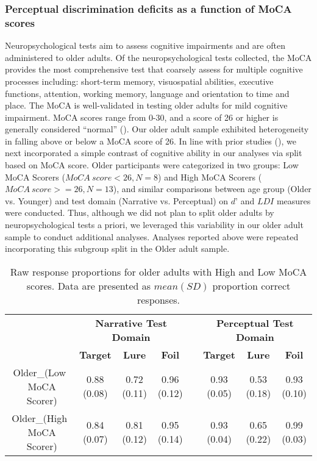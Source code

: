 \documentclass[11pt]{article}
\begin{document}
\subsubsection*{Perceptual discrimination deficits as a function of MoCA scores}
Neuropsychological tests aim to assess cognitive impairments and are often administered to older adults. Of the neuropsychological tests collected, the MoCA provides the most comprehensive test that coarsely assess for multiple cognitive processes including: short-term memory, visuospatial abilities, executive functions, attention, working memory, language and orientation to time and place. The MoCA is well-validated in testing older adults for mild cognitive impairment. MoCA scores range from 0-30, and a score of 26 or higher is generally considered “normal” (\cite{nasreddine_montreal_2005}). Our older adult sample exhibited heterogeneity in falling above or below a MoCA score of 26. In line with prior studies (\cite{pishdadian_not_2020}), we next incorporated a simple contrast of cognitive ability in our analyses via split based on MoCA score. Older participants were categorized in two groups: Low MoCA Scorers ($MoCA \ score < 26, N = 8$) and High MoCA Scorers ($MoCA \ score >= 26, N =13$), and similar comparisons between age group (Older vs. Younger) and test domain (Narrative vs. Perceptual) on $d’$ and $LDI$ measures were conducted. Thus, although we did not plan to split older adults by neuropsychological tests a priori, we leveraged this variability in our older adult sample to conduct additional analyses. Analyses reported above were repeated incorporating this subgroup split in the Older adult sample.

\begin{table}[]
\begin{tabular}{cccccccc}
                                & \multicolumn{3}{c}{\textbf{Narrative Test Domain}} & \textbf{} & \multicolumn{3}{c}{\textbf{Perceptual Test Domain}} \\ \cline{2-4} \cline{6-8} 
 & \textbf{Target} & \textbf{Lure} & \textbf{Foil} & \textbf{} & \textbf{Target} & \textbf{Lure} & \textbf{Foil} \\ \cline{2-4} \cline{6-8} 
Older_{(Low \ MoCA \ Scorer)}    & 0.88 (0.08)     & 0.72 (0.11)     & 0.96 (0.12)    &           & 0.93 (0.05)     & 0.53 (0.18)     & 0.93 (0.10)     \\
Older_{(High \ MoCA \ Scorer)} & 0.84 (0.07)     & 0.81 (0.12)     & 0.95 (0.14)    &           & 0.93 (0.04)     & 0.65 (0.22)     & 0.99 (0.03)    
\end{tabular}
\caption{Raw response proportions for older adults with High and Low MoCA scores. Data are presented as $mean (SD)$ proportion correct responses.}
\label{table3}
\end{table}
\end{document}
